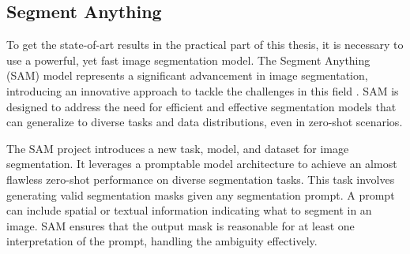 


  \subsection{Segment Anything}
To get the state-of-art results in the practical part of this thesis, it is necessary to use a powerful, yet fast
image
segmentation model. The Segment Anything (SAM) model represents a significant advancement in image segmentation,
introducing an innovative approach to tackle the challenges in this field \cite{SAM2023}. SAM is designed to address
the need
for
efficient and effective segmentation models that can generalize to diverse tasks and data distributions, even in zero-shot scenarios.

The SAM project introduces a new task, model, and dataset for image segmentation. It leverages a promptable model
architecture to achieve an almost flawless zero-shot performance on diverse segmentation tasks. This task involves
generating valid segmentation masks given any segmentation prompt. A prompt can include spatial or textual
information indicating what to segment in an image. SAM ensures that the output mask is reasonable for at least one
interpretation of the prompt, handling the ambiguity effectively.

